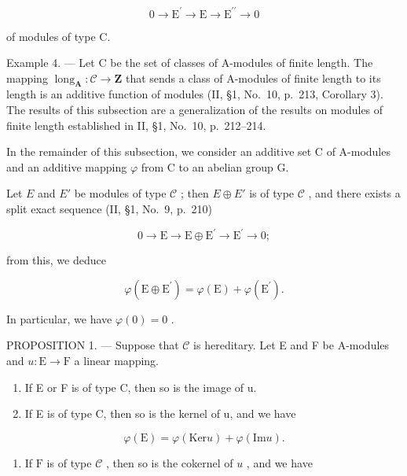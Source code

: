 \[
0 \longrightarrow \mathrm{E} ^ {\prime} \longrightarrow \mathrm{E} \longrightarrow \mathrm{E} ^ {\prime \prime} \longrightarrow 0
\]

of modules of type C.

Example 4. --- Let C be the set of classes of A-modules of finite length. The mapping \(\operatorname{long}_{\mathbf{A}} : \mathcal{C} \to \mathbf{Z}\) that sends a class of A-modules of finite length to its length is an additive function of modules (II, §1, No.~10, p.~213, Corollary 3). The results of this subsection are a generalization of the results on modules of finite length established in II, §1, No.~10, p.~212--214.

In the remainder of this subsection, we consider an additive set C of A-modules and an additive mapping \(\varphi\) from C to an abelian group G.

Let \(E\) and \(E'\) be modules of type \(\mathcal{C}\) ; then \(E \oplus E'\) is of type \(\mathcal{C}\) , and there exists a split exact sequence (II, §1, No.~9, p.~210)

\[
0 \longrightarrow \mathrm{E} \longrightarrow \mathrm{E} \oplus \mathrm{E} ^ {\prime} \longrightarrow \mathrm{E} ^ {\prime} \longrightarrow 0;
\]

from this, we deduce

\[
\varphi (\mathrm{E} \oplus \mathrm{E} ^ {\prime}) = \varphi (\mathrm{E}) + \varphi (\mathrm{E} ^ {\prime}).\tag{1}
\]

In particular, we have \(\varphi(0) = 0\) .

PROPOSITION 1. --- Suppose that \(\mathcal{C}\) is hereditary. Let E and F be A-modules and \(u: \mathrm{E} \to \mathrm{F}\) a linear mapping.

\begin{enumerate}
\def\labelenumi{\alph{enumi})}
\item
  If E or F is of type C, then so is the image of u.
\item
  If E is of type C, then so is the kernel of u, and we have
\end{enumerate}

\[
\varphi (\mathrm{E}) = \varphi (\mathrm{Ker} u) + \varphi (\mathrm{Im} u).\tag{2}
\]

\begin{enumerate}
\def\labelenumi{\alph{enumi})}
\setcounter{enumi}{2}
\tightlist
\item
  If \(\mathrm{F}\) is of type \(\mathcal{C}\) , then so is the cokernel of \(u\) , and we have
\end{enumerate}

